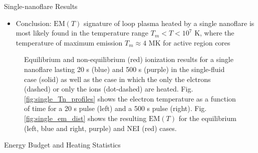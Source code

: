 \documentclass[final]{beamer}
\begin{document}
\begin{frame}
\begin{columns}[t]
\begin{column}{0.49\linewidth}
\begin{block}{Single-nanoflare Results}
\begin{itemize}
\begin{itemize}
          \item Calculating $T_{eff}$ due to NEI shows that, even for very short pulses, there is little to no emission visible above 10 MK, for the single-fluid, electron heating, and ion heating cases
        \end{itemize}
        \item Conclusion: \alert{$\mathrm{EM}(T)$ signature of loop plasma heated by a single nanoflare is most likely found in the temperature range $T_m<T<10^7$ K}, where the temperature of maximum emission $T_m\approx4$ MK for active region cores \citep{warren_systematic_2012}
      \end{itemize}
      \begin{figure}
        \caption{Equilibrium and non-equilibrium (red) ionization results for a single nanoflare lasting 20 s (blue) and 500 s (purple) in the single-fluid case (solid) as well as the case in which the only the elctrons (dashed) or only the ions (dot-dashed) are heated. Fig. \ref{fig:single_Tn_profiles} shows the electron temperature as a function of time for a 20 s pulse (left) and a 500 s pulse (right). Fig. \ref{fig:single_em_dist} shows the resulting $\mathrm{EM}(T)$ for the equilibrium (left, blue and right, purple) and NEI (red) cases.}
      \end{figure}
    \end{block}
    \begin{block}{Energy Budget and Heating Statistics}
      \begin{columns}[T]
      \begin{column}{0.49\columnwidth}
        \begin{figure}

\end{figure}
\end{column}
\end{columns}
\end{block}
\end{column}
\end{columns}
\end{frame}
\end{document}
